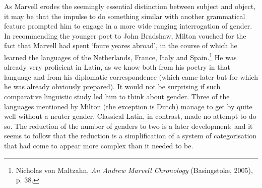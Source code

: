 ﻿\documentclass[12pt]{article}
\newcommand{\citedtitle}[1]{\textit{#1}}
\begin{document}
As
Marvell erodes the seemingly essential distinction between subject and object,
it may be that the impulse to do something similar with another grammatical
feature prompted him to engage in a more wide ranging interrogation of gender.
In recommending the younger poet to John Bradshaw, Milton vouched for the fact
that Marvell had spent ‘foure yeares abroad’, in the course of which he learned
the languages of the Netherlands, France, Italy and Spain.\footnote{Nicholas von Maltzahn, \citedtitle{An
Andrew Marvell Chronology} (Basingstoke, 2005), p. 38.} He was
already very proficient in Latin, as we know both from his poetry in that
language and from his diplomatic correspondence (which came later but for which
he was already obviously prepared). It would not be surprising if such
comparative linguistic study led him to think about gender. Three of the
languages mentioned by Milton (the exception is Dutch) manage to get by quite
well without a neuter gender. Classical Latin, in contrast, made no attempt to
do so.  The reduction of the number of genders to two is a later development;
and it seems to follow that the reduction is a simplification of a system of
categorisation that had come to appear more complex than it needed to be.
\end{document}
